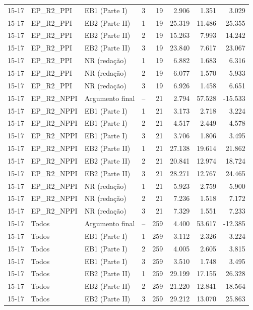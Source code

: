 \begin{longtable}{lllcrrrr}
15-17 & EP\_R2\_PPI & EB1 (Parte I) & 3 & 19 & 2.906 & 1.351 & 3.029 \\
15-17 & EP\_R2\_PPI & EB2 (Parte II) & 1 & 19 & 25.319 & 11.486 & 25.355 \\
15-17 & EP\_R2\_PPI & EB2 (Parte II) & 2 & 19 & 15.263 & 7.993 & 14.242 \\
15-17 & EP\_R2\_PPI & EB2 (Parte II) & 3 & 19 & 23.840 & 7.617 & 23.067 \\
15-17 & EP\_R2\_PPI & NR (redação) & 1 & 19 & 6.882 & 1.683 & 6.316 \\
15-17 & EP\_R2\_PPI & NR (redação) & 2 & 19 & 6.077 & 1.570 & 5.933 \\
15-17 & EP\_R2\_PPI & NR (redação) & 3 & 19 & 6.926 & 1.458 & 6.651 \\
15-17 & EP\_R2\_NPPI & Argumento final & -- & 21 & 2.794 & 57.528 & -15.533 \\
15-17 & EP\_R2\_NPPI & EB1 (Parte I) & 1 & 21 & 3.173 & 2.718 & 3.224 \\
15-17 & EP\_R2\_NPPI & EB1 (Parte I) & 2 & 21 & 4.517 & 2.449 & 4.578 \\
15-17 & EP\_R2\_NPPI & EB1 (Parte I) & 3 & 21 & 3.706 & 1.806 & 3.495 \\
15-17 & EP\_R2\_NPPI & EB2 (Parte II) & 1 & 21 & 27.138 & 19.614 & 21.862 \\
15-17 & EP\_R2\_NPPI & EB2 (Parte II) & 2 & 21 & 20.841 & 12.974 & 18.724 \\
15-17 & EP\_R2\_NPPI & EB2 (Parte II) & 3 & 21 & 28.271 & 12.767 & 24.465 \\
15-17 & EP\_R2\_NPPI & NR (redação) & 1 & 21 & 5.923 & 2.759 & 5.900 \\
15-17 & EP\_R2\_NPPI & NR (redação) & 2 & 21 & 7.236 & 1.518 & 7.172 \\
15-17 & EP\_R2\_NPPI & NR (redação) & 3 & 21 & 7.329 & 1.551 & 7.233 \\
15-17 & Todos & Argumento final & -- & 259 & 4.400 & 53.617 & -12.385 \\
15-17 & Todos & EB1 (Parte I) & 1 & 259 & 3.112 & 2.326 & 3.224 \\
15-17 & Todos & EB1 (Parte I) & 2 & 259 & 4.005 & 2.605 & 3.815 \\
15-17 & Todos & EB1 (Parte I) & 3 & 259 & 3.510 & 1.748 & 3.495 \\
15-17 & Todos & EB2 (Parte II) & 1 & 259 & 29.199 & 17.155 & 26.328 \\
15-17 & Todos & EB2 (Parte II) & 2 & 259 & 21.220 & 12.841 & 18.564 \\
15-17 & Todos & EB2 (Parte II) & 3 & 259 & 29.212 & 13.070 & 25.863 \\

\end{longtable}
